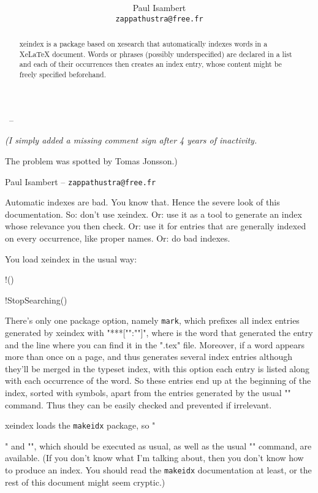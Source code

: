\documentclass[%
]{codedoc}
\title{\FileName\\\FileVersion}
\author{Paul Isambert\\\texttt{zappathustra@free.fr}}
\date{\FileDate}
\begin{document}

{\Huge\hfill\FileName}\par
\hfill\FileVersion\ – \FileDate\par
{\it \hfill(I simply added a missing comment sign after 4 years of inactivity.\par
\hfill The problem was spotted by Tomas Jonsson.)\par}
\hfill Paul Isambert – \texttt{zappathustra@free.fr}\par


\begin{abstract}
xeindex is a package based on xesearch that automatically
indexes words in a XeLaTeX document. Words or phrases
(possibly underspecified) are declared in a list and
each of their occurrences then creates an index entry,
whose content might be freely specified beforehand.
\end{abstract}

\thispagestyle{empty}
Automatic indexes are bad. You know that. Hence the severe
look of this documentation. So: don't use xeindex.
Or: use it as a tool to generate an index whose relevance
you then check. Or: use it for entries that are generally indexed
on every occurrence, like proper names. Or: do bad indexes.

You load xeindex in the usual way:

\VerbCommand!()
\begin{example}
!StopSearching()\usepackage{xeindex}
\end{example}
\UndoVerbCommand

\noindent
There's only one package option, namely \texttt{mark}, which
prefixes all index entries generated by xeindex with
"***["":""]", where 
is the word that generated the entry and 
the line where you can find it in the ".tex" file. Moreover,
if a word appears more than once on a page, and thus generates
several index entries although they'll be merged in the
typeset index, with this option each entry is listed along
with each occurrence of the word.
So these entries end up at the beginning of the index, sorted with
symbols, apart from the entries generated by the usual
"\index" command. Thus they can be easily checked and prevented
if irrelevant.

\DescribeMacro\makeindex\macroskip\baselineskip
\DescribeMacro\printindex{}\baselineskip
{}
xeindex loads the \texttt{makeidx} package, so "\makeindex" and "\printindex",
which should be executed as usual, as well as the usual "\index" command,
are available. (If you don't know what I'm talking about, then you
don't know how to produce an index. You should read the \texttt{makeidx}
documentation at least, or the rest of this document might seem cryptic.)
\end{document}

